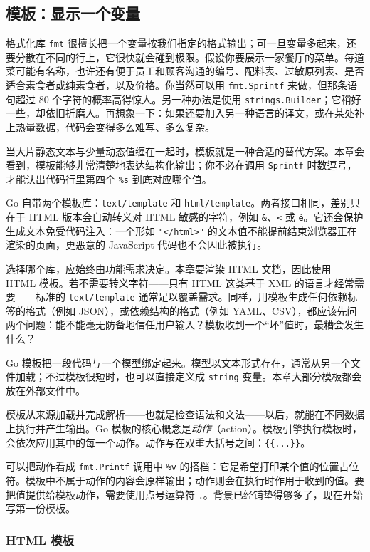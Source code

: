 \subsection{模板：显示一个变量}

格式化库 \texttt{fmt} 很擅长把一个变量按我们指定的格式输出；可一旦变量多起来，还要分散在不同的行上，它很快就会碰到极限。假设你要展示一家餐厅的菜单。每道菜可能有名称，也许还有便于员工和顾客沟通的编号、配料表、过敏原列表、是否适合素食者或纯素食者，以及价格。你当然可以用 \texttt{fmt.Sprintf} 来做，但那条语句超过 80 个字符的概率高得惊人。另一种办法是使用 \texttt{strings.Builder}；它稍好一些，却依旧折磨人。再想象一下：如果还要加入另一种语言的译文，或在某处补上热量数据，代码会变得多么难写、多么复杂。

当大片静态文本与少量动态值缠在一起时，模板就是一种合适的替代方案。本章会看到，模板能够非常清楚地表达结构化输出；你不必在调用 \texttt{Sprintf} 时数逗号，才能认出代码行里第四个 \texttt{\%s} 到底对应哪个值。

Go 自带两个模板库：\texttt{text/template} 和 \texttt{html/template}。两者接口相同，差别只在于 HTML 版本会自动转义对 HTML 敏感的字符，例如 \texttt{\&}、\texttt{<} 或 \texttt{é}。它还会保护生成文本免受代码注入：一个形如 \texttt{"</html>"} 的文本值不能提前结束浏览器正在渲染的页面，更恶意的 JavaScript 代码也不会因此被执行。

选择哪个库，应始终由功能需求决定。本章要渲染 HTML 文档，因此使用 HTML 模板。若不需要转义字符——只有 HTML 这类基于 XML 的语言才经常需要——标准的 \texttt{text/template} 通常足以覆盖需求。同样，用模板生成任何依赖标签的格式（例如 JSON），或依赖结构的格式（例如 YAML、CSV），都应该先问两个问题：能不能毫无防备地信任用户输入？模板收到一个“坏”值时，最糟会发生什么？

Go 模板把一段代码与一个模型绑定起来。模型以文本形式存在，通常从另一个文件加载；不过模板很短时，也可以直接定义成 \texttt{string} 变量。本章大部分模板都会放在外部文件中。

模板从来源加载并完成解析——也就是检查语法和文法——以后，就能在不同数据上执行并产生输出。Go 模板的核心概念是\emph{动作}（action）。模板引擎执行模板时，会依次应用其中的每一个动作。动作写在双重大括号之间：\texttt{\{\{...\}\}}。

可以把动作看成 \texttt{fmt.Printf} 调用中 \texttt{\%v} 的搭档：它是希望打印某个值的位置占位符。模板中不属于动作的内容会原样输出；动作则会在执行时作用于收到的值。要把值提供给模板动作，需要使用点号运算符 \texttt{.}。背景已经铺垫得够多了，现在开始写第一份模板。

\subsubsection{HTML 模板}

